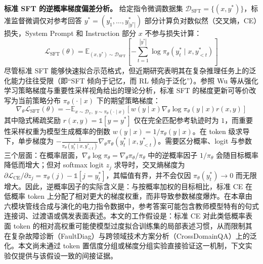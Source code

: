 \documentclass[fontset=fandol,type=master,campus=shenzhen,etitleauto=true]{hithesisbook}
\begin{document}
\textbf{标准 SFT 的逆概率梯度偏差分析。} 给定指令微调数据集 $\mathcal{D}_{\text{SFT}} = \{(x, y^*)\}$，标准监督微调仅对参考回答 $y^* = (y_1^*, \ldots, y_{|y^*|}^*)$ 部分计算负对数似然（交叉熵，CE）损失，System Prompt 和 Instruction 部分 $x$ 不参与损失计算：
\begin{equation}
\mathcal{L}_{\text{SFT}}(\theta) = \mathbb{E}_{(x, y^*) \sim \mathcal{D}_{\text{SFT}}} \left[ -\sum_{t=1}^{|y^*|} \log \pi_\theta(y_t^* \mid x, y_{<t}^*) \right]
\end{equation}
尽管标准 SFT 能够快速拟合示范格式，但近期研究表明其在复杂推理任务上的泛化能力往往受限（即``SFT 倾向于记忆，而 RL 倾向于泛化''）。参照 Wu 等\cite{ref82}从强化学习策略梯度与重要性采样视角给出的理论分析，标准 SFT 的梯度更新可等价改写为当前策略分布 $\pi_\theta(\cdot \mid x)$ 下的期望策略梯度：
\begin{equation}
\nabla_\theta \mathcal{L}_{\text{SFT}}(\theta) = -\mathbb{E}_{x \sim \mathcal{D}_x,\; y \sim \pi_\theta(\cdot \mid x)} \left[ w(y \mid x) \nabla_\theta \log \pi_\theta(y \mid x) r(x, y) \right]
\end{equation}
其中隐式稀疏奖励 $r(x, y) = \mathbb{1}[y = y^*]$ 仅在完全匹配参考轨迹时为 $1$，而重要性采样权重为模型生成概率的倒数 $w(y \mid x) = 1 / \pi_\theta(y \mid x)$。在 token 级求导下，单步梯度为 $-\frac{1}{\pi_\theta(y_t^* \mid x, y_{<t}^*)} \nabla_\theta \pi_\theta(y_t^* \mid x, y_{<t}^*)$。需要区分概率、logit 与参数三个层面：在概率层面，$\nabla_\theta \log \pi_\theta = \nabla_\theta \pi_\theta / \pi_\theta$ 中的逆概率因子 $1/\pi_\theta$ 会随目标概率降低而增大；但对 softmax logit $z_j$ 求导时，交叉熵梯度为 $\partial \mathcal{L}_{\text{CE}} / \partial z_j = \pi_\theta(j) - \mathbb{1}[j = y_t^*]$，其幅值有界，并不会仅因 $\pi_\theta(y_t^*) \to 0$ 而无限增大。因此，逆概率因子的实际含义是：与按概率加权的目标相比，标准 CE 在低概率 token 上分配了相对更大的梯度权重，而非导致参数梯度爆炸。在本章由六模块管线合成与演化的电力指令数据中，参考答案可能包含教师模型特有的句式连接词、过渡语或偶发表面表述。本文的工作假设是：标准 CE 对此类低概率表面 token 的相对高权重可能使模型过度拟合训练集的局部表述习惯，从而限制其在复杂故障诊断（FaultDiag）与跨领域技术方案分析（CrossDomainQA）上的泛化。本文尚未通过 token 置信度分组或梯度分组实验直接验证这一机制，下文实验仅提供与该假设一致的间接证据。
\end{document}
